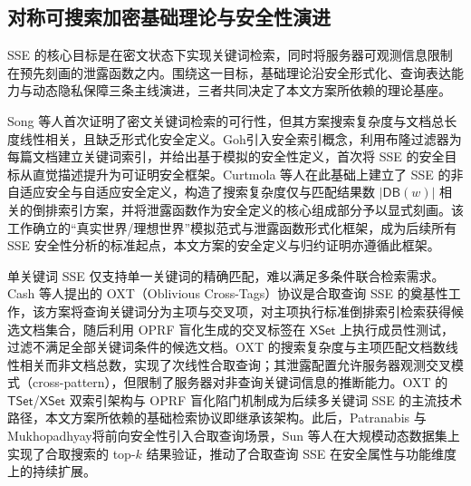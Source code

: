 \subsection{对称可搜索加密基础理论与安全性演进}

SSE 的核心目标是在密文状态下实现关键词检索，同时将服务器可观测信息限制在预先刻画的泄露函数之内\cite{7958577,10.1007/978-3-642-17373-8_33}。围绕这一目标，基础理论沿安全形式化、查询表达能力与动态隐私保障三条主线演进，三者共同决定了本文方案所依赖的理论基座。

Song 等人\cite{848445}首次证明了密文关键词检索的可行性，但其方案搜索复杂度与文档总长度线性相关，且缺乏形式化安全定义。Goh\cite{goh03,10.1145/362686.362692,im/1109191032,10.1145/383962.384004}引入安全索引概念，利用布隆过滤器为每篇文档建立关键词索引，并给出基于模拟的安全性定义，首次将 SSE 的安全目标从直觉描述提升为可证明安全框架。Curtmola 等人\cite{10.1145/1180405.1180417,kamara2013parallel,asharov2016searchable}在此基础上建立了 SSE 的非自适应安全与自适应安全定义，构造了搜索复杂度仅与匹配结果数 $|\mathsf{DB}(w)|$ 相关的倒排索引方案，并将泄露函数作为安全定义的核心组成部分予以显式刻画。该工作确立的``真实世界/理想世界''模拟范式与泄露函数形式化框架，成为后续所有 SSE 安全性分析的标准起点，本文方案的安全定义与归约证明亦遵循此框架。

单关键词 SSE 仅支持单一关键词的精确匹配，难以满足多条件联合检索需求。Cash 等人\cite{10.1007/978-3-642-40041-4_20,10.1145/3243734.3243753,10.1109/SP.2014.30,10.1007/978-3-319-24177-7_7,boneh2007conjunctive,demertzis2016practical}提出的 OXT（Oblivious Cross-Tags）协议是合取查询 SSE 的奠基性工作，该方案将查询关键词分为主项与交叉项，对主项执行标准倒排索引检索获得候选文档集合，随后利用 OPRF 盲化生成的交叉标签在 $\mathsf{XSet}$ 上执行成员性测试，过滤不满足全部关键词条件的候选文档。OXT 的搜索复杂度与主项匹配文档数线性相关而非文档总数，实现了次线性合取查询；其泄露配置允许服务器观测交叉模式（cross-pattern），但限制了服务器对非查询关键词信息的推断能力。OXT 的 $\mathsf{TSet}$/$\mathsf{XSet}$ 双索引架构与 OPRF 盲化陷门机制成为后续多关键词 SSE 的主流技术路径，本文方案所依赖的基础检索协议即继承该架构。此后，Patranabis 与 Mukhopadhyay\cite{patranabis2021forward}将前向安全性引入合取查询场景，Sun 等人\cite{7218596}在大规模动态数据集上实现了合取搜索的 top-$k$ 结果验证，推动了合取查询 SSE 在安全属性与功能维度上的持续扩展。

